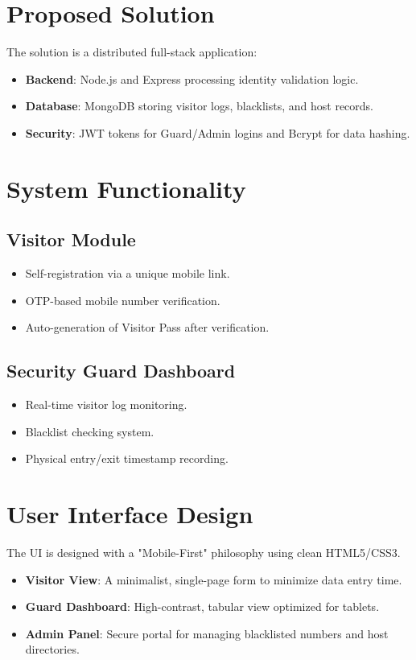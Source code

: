 \documentclass[12pt,a4paper]{article}
\begin{document}
\section{Proposed Solution}
The solution is a distributed full-stack application:
\begin{itemize}
    \item \textbf{Backend}: Node.js and Express processing identity validation logic.
    \item \textbf{Database}: MongoDB storing visitor logs, blacklists, and host records.
    \item \textbf{Security}: JWT tokens for Guard/Admin logins and Bcrypt for data hashing.
\end{itemize}

\section{System Functionality}
\subsection{Visitor Module}
\begin{itemize}
    \item Self-registration via a unique mobile link.
    \item OTP-based mobile number verification.
    \item Auto-generation of Visitor Pass after verification.
\end{itemize}

\subsection{Security Guard Dashboard}
\begin{itemize}
    \item Real-time visitor log monitoring.
    \item Blacklist checking system.
    \item Physical entry/exit timestamp recording.
\end{itemize}

\section{User Interface Design}
The UI is designed with a "Mobile-First" philosophy using clean HTML5/CSS3.
\begin{itemize}
    \item \textbf{Visitor View}: A minimalist, single-page form to minimize data entry time.
    \item \textbf{Guard Dashboard}: High-contrast, tabular view optimized for tablets.
    \item \textbf{Admin Panel}: Secure portal for managing blacklisted numbers and host directories.
\end{itemize}
\end{document}
